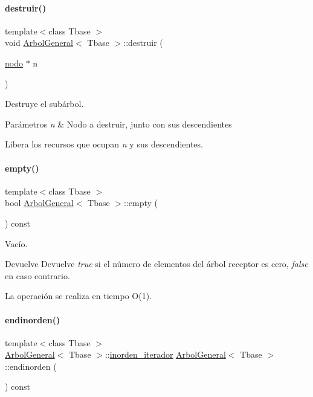 \paragraph{\texorpdfstring{destruir()}{destruir()}}
{\footnotesize\ttfamily template$<$class Tbase $>$ \\
void \hyperlink{classArbolGeneral}{Arbol\+General}$<$ Tbase $>$\+::destruir (\begin{DoxyParamCaption}\item[{\hyperlink{structArbolGeneral_1_1nodo}{nodo} $\ast$}]{n }\end{DoxyParamCaption})\hspace{0.3cm}{\ttfamily [private]}}



Destruye el subárbol. 


\begin{DoxyParams}{Parámetros}
{\em n} & Nodo a destruir, junto con sus descendientes\\
\hline
\end{DoxyParams}
Libera los recursos que ocupan {\itshape n} y sus descendientes. \hypertarget{classArbolGeneral_a9f4d947bee0af4ff4678accf263ea843}{}\label{classArbolGeneral_a9f4d947bee0af4ff4678accf263ea843} 
\paragraph{\texorpdfstring{empty()}{empty()}}
{\footnotesize\ttfamily template$<$class Tbase $>$ \\
bool \hyperlink{classArbolGeneral}{Arbol\+General}$<$ Tbase $>$\+::empty (\begin{DoxyParamCaption}{ }\end{DoxyParamCaption}) const}



Vacío. 

\begin{DoxyReturn}{Devuelve}
Devuelve {\itshape true} si el número de elementos del árbol receptor es cero, {\itshape false} en caso contrario.
\end{DoxyReturn}
La operación se realiza en tiempo O(1). \hypertarget{classArbolGeneral_aedd96d245784059fb2da2aa18e4a45a0}{}\label{classArbolGeneral_aedd96d245784059fb2da2aa18e4a45a0} 
\paragraph{\texorpdfstring{endinorden()}{endinorden()}}
{\footnotesize\ttfamily template$<$class Tbase $>$ \\
\hyperlink{classArbolGeneral}{Arbol\+General}$<$ Tbase $>$\+::\hyperlink{classArbolGeneral_1_1inorden__iterador}{inorden\+\_\+iterador} \hyperlink{classArbolGeneral}{Arbol\+General}$<$ Tbase $>$\+::endinorden (\begin{DoxyParamCaption}{ }\end{DoxyParamCaption}) const}



